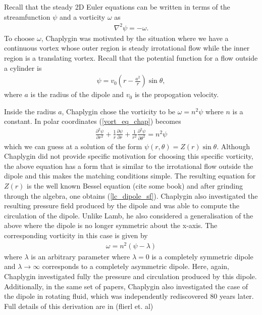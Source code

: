 Recall that the steady 2D Euler equations can be written in terms of the streamfunction $\psi$ and a vorticity $\omega$ as
\begin{align}
\nabla^{2} \psi = - \omega.\label{vort_eq_chap}
\end{align}
To choose $\omega$, Chaplygin was motivated by the situation where we have a continuous vortex whose outer region is steady irrotational flow while the inner region is a translating vortex. Recall that the potential function for a flow outside a cylinder is
\begin{align}
\psi = v_{0}\left(r - \frac{a^{2}}{r}\right)\sin\theta ,
\end{align}
where $a$ is the radius of the dipole and $v_{0}$ is the propogation velocity. 

Inside the radius $a$, Chaplygin chose the vorticity to be $\omega = n^{2}\psi$ where $n$ is a constant. In polar coordinates (\ref{vort_eq_chap}) becomes
\begin{align}
\frac{\partial^{2}\psi}{\partial r^{2}} + \frac{1}{r}\frac{\partial \psi}{\partial r} + \frac{1}{r^{2}}\frac{\partial^{2}\psi}{\partial \theta^{2}} =  n^{2}\psi
\end{align}
which we can guess at a solution of the form $\psi(r,\theta) = Z(r)\sin\theta$. Although Chaplygin did not provide specific motivation for choosing this specific vorticity, the above equation has a form that is similar to the irrotational flow outside the dipole and this makes the matching conditions simple. The resulting equation for $Z(r)$ is the well known Bessel equation (cite some book) and after grinding through the algebra, one obtains (\ref{lc_dipole_sf}). Chaplygin also investigated the resulting pressure field produced by the dipole and was able to compute the circulation of the dipole. Unlike Lamb, he also considered a generalisation of the above where the dipole is no longer symmetric about the x-axis. The corresponding vorticity in this case is given by
\begin{align}
\omega = n^{2}(\psi - \lambda)
\end{align}
where $\lambda$ is an arbitrary parameter where $\lambda=0$ is a completely symmetric dipole and $\lambda\rightarrow\infty$ corresponds to a completely asymmetric dipole. Here, again, Chaplygin investigated fully the pressure and circulation produced by this dipole. Additionally, in the same set of papers, Chaplygin also investigated the case of the dipole in rotating fluid, which was independently rediscovered 80 years later. Full details of this derivation are in \cite{meleshko1994} (flierl et. al) 

